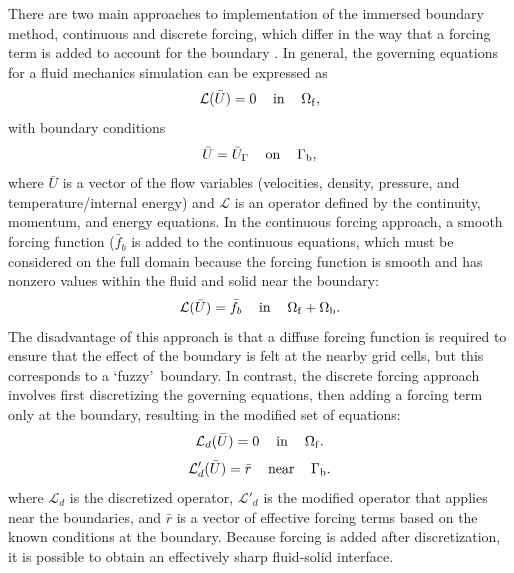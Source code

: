 \documentclass{article}
\begin{document}
There are two main approaches to implementation of the immersed boundary method, continuous and discrete forcing, which differ in the way that a forcing term is added to account for the boundary \cite{mittal2005}. In general, the governing equations for a fluid mechanics simulation can be expressed as
\begin{equation}
\mathcal{L}(\bar{U}) = 0 \hspace{12pt} \rm{in} \hspace{12pt}  \Omega_f,
\end{equation}
with boundary conditions
\begin{equation}
\bar{U} = \bar{U}_\Gamma \hspace{12pt} \rm{on} \hspace{12pt}  \Gamma_b,
\end{equation}
where $\bar{U}$ is a vector of the flow variables (velocities, density, pressure, and temperature/internal energy) and $\mathcal{L}$ is an operator defined by the continuity, momentum, and energy equations. In the continuous forcing approach, a smooth forcing function ($\bar{f}_b$ is added to the continuous equations, which must be considered on the full domain because the forcing function is smooth and has nonzero values within the fluid and solid near the boundary:
\begin{equation}
\mathcal{L}(\bar{U}) = \bar{f}_b \hspace{12pt} \rm{in} \hspace{12pt}  \Omega_f + \Omega_b.
\end{equation}
The disadvantage of this approach is that a diffuse forcing function is required to ensure that the effect of the boundary is felt at the nearby grid cells, but this corresponds to a \lq fuzzy\rq\ boundary. In contrast, the discrete forcing approach involves first discretizing the governing equations, then adding a forcing term only at the boundary, resulting in the modified set of equations:
\begin{equation}
\mathcal{L}_d(\bar{U}) = 0 \hspace{12pt} \rm{in} \hspace{12pt}  \Omega_f.
\end{equation}
\begin{equation}
\mathcal{L}'_d(\bar{U}) = \bar{r} \hspace{12pt} \rm{near} \hspace{12pt}  \Gamma_b.
\end{equation}
where $\mathcal{L}_d$ is the discretized operator, $\mathcal{L}'_d$ is the modified operator that applies near the boundaries, and $\bar{r}$ is a vector of effective forcing terms based on the known conditions at the boundary. Because forcing is added after discretization, it is possible to obtain an effectively sharp fluid-solid interface.
\end{document}
